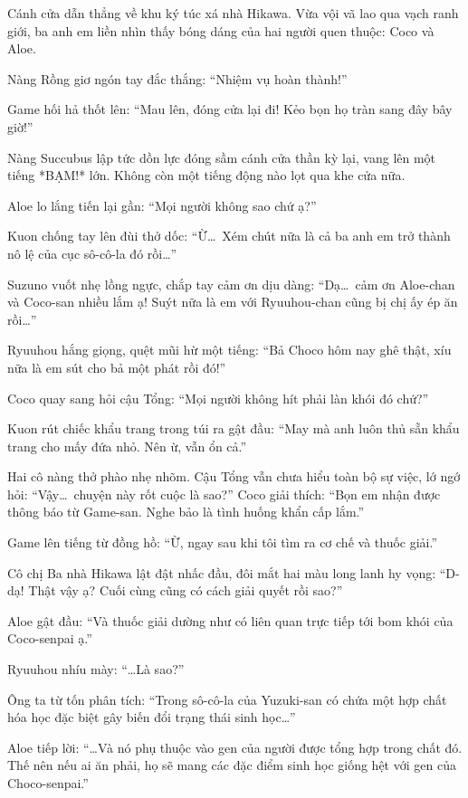 \documentclass[../main.tex]{subfiles}
\begin{document}
Cánh cửa dẫn thẳng về khu ký túc xá nhà Hikawa. Vừa vội vã lao qua vạch ranh giới, ba anh em liền nhìn thấy bóng dáng của hai người quen thuộc: Coco và Aloe.

Nàng Rồng giơ ngón tay đắc thắng: ``Nhiệm vụ hoàn thành!''

Game hối hả thốt lên: ``Mau lên, đóng cửa lại đi! Kẻo bọn họ tràn sang đây bây giờ!''

Nàng Succubus lập tức dồn lực đóng sầm cánh cửa thần kỳ lại, vang lên một tiếng *BẠM!* lớn. Không còn một tiếng động nào lọt qua khe cửa nữa.

Aloe lo lắng tiến lại gần: ``Mọi người không sao chứ ạ?''

Kuon chống tay lên đùi thở dốc: ``Ừ\dots\ Xém chút nữa là cả ba anh em trở thành nô lệ của cục sô-cô-la đó rồi\dots''

Suzuno vuốt nhẹ lồng ngực, chắp tay cảm ơn dịu dàng: ``Dạ\dots\ cảm ơn Aloe-chan và Coco-san nhiều lắm ạ! Suýt nữa là em với Ryuuhou-chan cũng bị chị ấy ép ăn rồi\dots''

Ryuuhou hắng giọng, quệt mũi hừ một tiếng: ``Bả Choco hôm nay ghê thật, xíu nữa là em sút cho bả một phát rồi đó!''

Coco quay sang hỏi cậu Tổng: ``Mọi người không hít phải làn khói đó chứ?''

Kuon rút chiếc khẩu trang trong túi ra gật đầu: ``May mà anh luôn thủ sẵn khẩu trang cho mấy đứa nhỏ. Nên ừ, vẫn ổn cả.''

Hai cô nàng thở phào nhẹ nhõm. Cậu Tổng vẫn chưa hiểu toàn bộ sự việc, lớ ngớ hỏi: ``Vậy\dots\ chuyện này rốt cuộc là sao?'' Coco giải thích: ``Bọn em nhận được thông báo từ Game-san. Nghe bảo là tình huống khẩn cấp lắm.''

Game lên tiếng từ đồng hồ: ``Ừ, ngay sau khi tôi tìm ra cơ chế và thuốc giải.''

Cô chị Ba nhà Hikawa lật đật nhấc đầu, đôi mắt hai màu long lanh hy vọng: ``D-dạ! Thật vậy ạ? Cuối cùng cũng có cách giải quyết rồi sao?''

Aloe gật đầu: ``Và thuốc giải dường như có liên quan trực tiếp tới bom khói của Coco-senpai ạ.''

Ryuuhou nhíu mày: ``\dots Là sao?''

Ông ta từ tốn phân tích: ``Trong sô-cô-la của Yuzuki-san có chứa một hợp chất hóa học đặc biệt gây biến đổi trạng thái sinh học\dots''

Aloe tiếp lời: ``\dots Và nó phụ thuộc vào gen của người được tổng hợp trong chất đó. Thế nên nếu ai ăn phải, họ sẽ mang các đặc điểm sinh học giống hệt với gen của Choco-senpai.''
\end{document}
